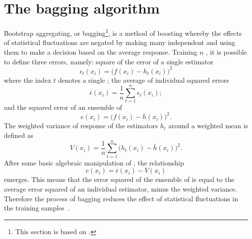 \section{The bagging algorithm}
\label{sec:bdt:bag}
Bootstrap aggregating, or bagging\footnote{
  This section is based on .}, is a method of boosting whereby the effects of
statistical fluctuations are negated by making many independent \DTs and using them
to make a decision based on the average response.
Training $n$ \DTs, it is possible to define three errors, namely:
square of the error of a single estimator
\begin{equation}
  \epsilon_t(x_i) = \big(f(x_i)-h_t(x_i)\big)^2
  \label{eq:bdt:bag1}
\end{equation}
where the index $t$ denotes a single \DT;
the average of individual squared errors
\begin{equation}
  \bar\epsilon(x_i) = \frac1n\sum_{t=1}^n\epsilon_t(x_i);
  \label{eq:bdt:bag2}
\end{equation}
and the squared error of an ensemble of \DTs
\begin{equation}
  e(x_i) = \big(f(x_i)-\bar h(x_i)\big)^2.
  \label{eq:bdt:bag3}
\end{equation}
The weighted variance of response of the estimators $h_t$ around a weighted mean is defined as
\begin{equation}
  V(x_i) = \frac1n\sum_{t=1}^n\big(h_t(x_i) - \bar h(x_i)\big)^2.
  \label{eq:bdt:bag4}
\end{equation}
After some basic algebraic manipulation of , the relationship
\begin{equation}
  e(x_i) = \bar\epsilon(x_i) - V(x_i)
  \label{eq:bdt:bag5}
\end{equation}
emerges.
This means that the error squared of the ensemble of \DTs is equal to the average error squared of an
individual estimator, minus the weighted variance.
Therefore the process of bagging reduces the
effect of statistical fluctuations in the training samples~\cite{Krogh95neuralnetwork}.

